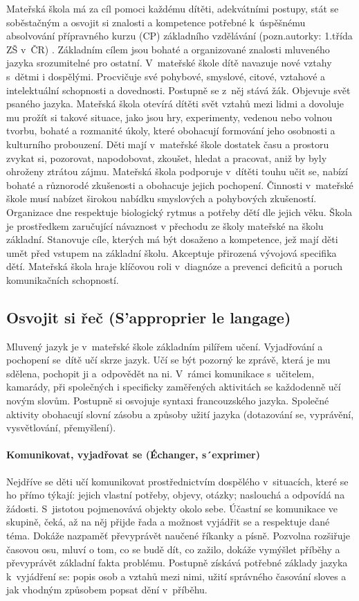 	Mateřská škola má za cíl pomoci každému dítěti, adekvátními postupy, stát se soběstačným a osvojit si znalosti a kompetence potřebné k úspěšnému absolvování přípravného kurzu (CP) základního vzdělávání (pozn.autorky: 1.třída ZŠ v ČR) . Základním cílem jsou bohaté a organizované  znalosti mluveného jazyka srozumitelné pro ostatní. V mateřské škole dítě navazuje nové vztahy s dětmi i dospělými. Procvičuje své pohybové, smyslové, citové, vztahové a intelektuální schopnosti a dovednosti. Postupně se z něj stává žák. Objevuje svět psaného jazyka. 
	Mateřská škola otevírá dítěti svět vztahů mezi lidmi a dovoluje mu prožít si takové situace, jako jsou hry, experimenty, vedenou nebo volnou tvorbu, bohaté a rozmanité úkoly, které obohacují formování jeho osobnosti a kulturního probouzení. 
	Děti mají v mateřské škole dostatek času a prostoru zvykat si, pozorovat, napodobovat, zkoušet, hledat a pracovat, aniž by byly ohroženy ztrátou zájmu. Mateřská škola podporuje v dítěti touhu učit se, nabízí bohaté a různorodé zkušenosti a obohacuje jejich pochopení. 
	Činnosti v mateřské škole musí nabízet širokou nabídku smyslových a pohybových zkušeností. Organizace dne respektuje biologický rytmus a potřeby dětí dle jejich věku. 
	Škola je prostředkem zaručující návaznost v přechodu ze školy mateřské na školu základní. Stanovuje cíle, kterých má být dosaženo a kompetence, jež mají děti umět před vstupem na základní školu. Akceptuje přirozená vývojová specifika dětí. Mateřská škola hraje klíčovou roli v diagnóze a prevenci deficitů a poruch komunikačních schopností.

		\subsection{Osvojit si řeč (S'approprier le langage)}
			Mluvený jazyk je v mateřské škole základním pilířem učení. Vyjadřování a pochopení se dítě učí skrze jazyk. Učí se být pozorný ke zprávě, která je mu sdělena, pochopit ji a odpovědět na ni. V rámci komunikace s učitelem, kamarády, při společných i specificky zaměřených aktivitách se každodenně učí novým slovům. Postupně si osvojuje syntaxi francouzského jazyka. Společné aktivity obohacují slovní zásobu a způsoby užití jazyka (dotazování se, vyprávění, vysvětlování, přemyšlení).

			\paragraph{Komunikovat, vyjadřovat se (Échanger, s´exprimer)}
			\break
			Nejdříve se děti učí komunikovat prostřednictvím dospělého v situacích, které se ho přímo týkají: jejich vlastní potřeby, objevy, otázky; naslouchá a odpovídá na žádosti. S jistotou pojmenovává objekty okolo sebe. Účastní se komunikace ve skupině, čeká, až na něj přijde řada a možnost vyjádřit se a respektuje dané téma. Dokáže nazpaměť převyprávět naučené říkanky a písně. Pozvolna rozšiřuje časovou osu, mluví o tom, co se budě dít, co zažilo, dokáže vymýšlet příběhy a převyprávět základní fakta problému. Postupně získává potřebné základy jazyka k vyjádření se: popis osob a vztahů mezi nimi, užití správného časování sloves a jak vhodným způsobem popsat dění v příběhu.

